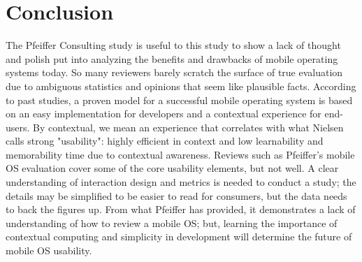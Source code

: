 \documentclass[11pt]{article}
\begin{document}
\section{Conclusion}
The Pfeiffer Consulting study is useful to this study to show a lack of thought and polish put into analyzing the benefits and drawbacks of mobile operating systems today. So many reviewers barely scratch the surface of true evaluation due to ambiguous statistics and opinions that seem like plausible facts. According to past studies, a proven model for a successful mobile operating system is based on an easy implementation for developers and a contextual experience for end-users. By contextual, we mean an experience that correlates with what Nielsen calls strong "usability": highly efficient in context and low learnability and memorability time due to contextual awareness. Reviews such as Pfeiffer's mobile OS evaluation cover some of the core usability elements, but not well. A clear understanding of interaction design and metrics is needed to conduct a study; the details may be simplified to be easier to read for consumers, but the data needs to back the figures up. From what Pfeiffer has provided, it demonstrates a lack of understanding of how to review a mobile OS; but, learning the importance of contextual computing and simplicity in development will determine the future of mobile OS usability.


\end{document}
